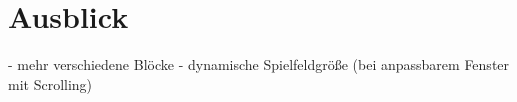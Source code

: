 \section{Ausblick}

- mehr verschiedene Blöcke
- dynamische Spielfeldgröße (bei anpassbarem Fenster mit Scrolling)